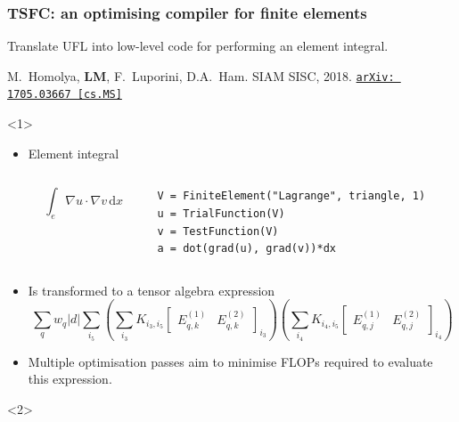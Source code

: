 \documentclass[presentation, 10pt]{beamer}
\newcommand{\arxivlink}[2]{%
  \href{http://www.arxiv.org/abs/#1}%
  {\texttt{arXiv:\,#1\,[#2]}}%
}
\begin{document}
\begin{frame}[fragile]
  \frametitle{TSFC: an optimising compiler for finite elements}
  Translate UFL into low-level code for performing an element integral.
  \begin{flushright}
    {\scriptsize M.~Homolya, \textbf{LM}, F.~Luporini, D.A.~Ham. SIAM
      SISC, 2018. \arxivlink{1705.03667}{cs.MS}}
  \end{flushright}
  \begin{overlayarea}{\textwidth}{0.8\textheight}
  \begin{onlyenv}<1> 
    \begin{itemize}
    \item Element integral
      \begin{columns}
        \begin{column}{0.4\textwidth}
          \begin{equation*}
            \int_e \nabla u \cdot \nabla v\,\text{d}x
          \end{equation*}
        \end{column}
        \hspace{-3em}
        \begin{column}{0.6\textwidth}
\begin{verbatim}
V = FiniteElement("Lagrange", triangle, 1)
u = TrialFunction(V)
v = TestFunction(V)
a = dot(grad(u), grad(v))*dx
\end{verbatim}
        \end{column}
      \end{columns}
    \item Is transformed to a tensor algebra expression
      {\small \begin{equation*}
    \sum_q w_q \left| d \right| \sum_{i_5} \left( \sum_{i_3}
      K_{i_3,i_5} \begin{bmatrix}
        E^{(1)}_{q,k} & E^{(2)}_{q,k}
      \end{bmatrix}_{i_3} \right)
    \left( \sum_{i_4} K_{i_4,i_5} \begin{bmatrix}
        E^{(1)}_{q,j} & E^{(2)}_{q,j}
      \end{bmatrix}_{i_4} \right)
  \end{equation*}}
\item Multiple optimisation passes aim to minimise FLOPs required to
  evaluate this expression.
    \end{itemize}
  \end{onlyenv}
  \begin{onlyenv}<2>

\end{onlyenv}
\end{overlayarea}
\end{frame}
\end{document}
